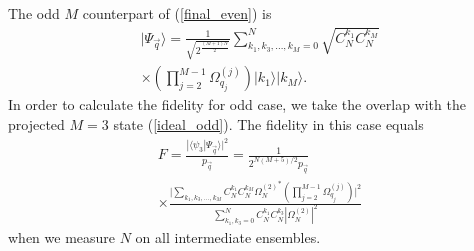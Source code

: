 \documentclass[%
  prx,%
  twocolumn,%
  preprintnumbers,%
  amsmath,%
  amssymb,%
  superscriptaddress%
]{revtex4}
\begin{document}
The odd $ M $ counterpart of (\ref{final_even}) is 
%
\begin{multline}
\label{final_odd}
| \Psi_{\vec{q}} \rangle=\frac{1}{\sqrt{2^{\frac{(M+1)N}{2}}}}\sum_{k_1,k_3,\ldots,k_M=0}^{N} \sqrt{ C^{k_1}_{N}  C^{k_M}_{N} } 
 \\ \times \left( \prod_{j=2}^{M-1} \Omega_{q_j}^{(j)} \right) |k_1\rangle|k_M\rangle . 
\end{multline}
%
In order to calculate the fidelity for odd case, we take the overlap with the projected $ M = 3 $ state (\ref{ideal_odd}). The fidelity in this case equals 
%
\begin{multline}
\label{fidelity_odd}
F = \frac{| \langle  \psi_3 | \Psi_{\vec{q}} \rangle |^2}{p_{\vec{q}} }   =\frac{1}{2^{N(M+5)/2} p_{\vec{q}} }\\
\times \frac{\Big|\sum_{k_1, k_3, \dots, k_M } 
 C_N^{k_1}C_N^{k_M} {\Omega_{N}^{(2)}}^* \left( \prod_{j=2}^{M-1} \Omega_{q_j}^{(j)} \right)   \Big|^2 }{ \sum_{k_1,k_3=0}^{N}  C^{k_1}_{N}  C^{k_3}_{N} | \Omega_{N}^{(2)} |^2 }
\end{multline}
%
when we measure $N$ on all  intermediate ensembles. 



%
\end{document}
